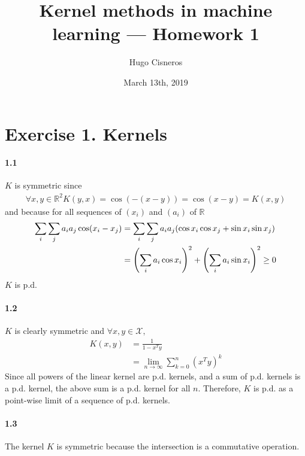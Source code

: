 \documentclass[10pt]{article}
\title{\Large Kernel methods in machine learning --- Homework 1}
\author{Hugo Cisneros}
\date{March 13th, 2019}
\begin{document}
    \maketitle

    \section*{Exercise 1. Kernels}

    \paragraph{1.1} $K$ is symmetric since 
    \begin{align*}
        \forall x,y \in \mathbb{R}^2 K(y, x) = \cos(-(x-y)) = \cos(x - y) = 
        K(x, y)
    \end{align*}
    and because for all sequences of $(x_i)$ and $(a_i)$ of $\mathbb{R}$
    \begin{align*}
        \tiny
        \sum_i\sum_j a_i a_j \cos(x_i - x_j) &= \sum_i\sum_j a_i a_j (\cos x_i
        \cos x_j + \sin x_i \sin x_j)\\
        &= \left(\sum_i a_i \cos x_i\right)^2 + \left(\sum_i a_i 
        \sin x_i\right)^2 \geq 0
    \end{align*}
    $K$ is p.d.

    \paragraph{1.2}
    $K$ is clearly symmetric and $\forall x, y \in \mathcal{X}, $
    \begin{align*}
        K(x,y) &= \frac{1}{1 - x^Ty}\\
        & = \lim_{n\rightarrow\infty} \sum_{k=0}^n (x^T y)^k \tag{converges 
        because by C-S $|x^Ty|
        \leq \lVert x \rVert_2\lVert y\rVert_2 < 1$}
    \end{align*}
    Since all powers of the linear kernel are p.d. kernels, and a sum of p.d. 
    kernels is a p.d. kernel, the above sum is a p.d. kernel for all $n$.
    Therefore, $K$ is p.d. as a point-wise limit of a sequence of p.d. kernels. 
    \paragraph{1.3} The kernel $K$ is symmetric because the intersection is a 
    commutative operation. 
\end{document}
